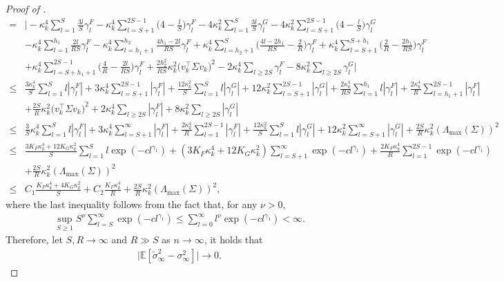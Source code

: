 \documentclass[11pt]{article}
\theoremstyle{plain}
\theoremstyle{definition}
\begin{document}
\begin{proof}[Proof of ]
\begin{align}
    =&\bigg|-\kappa_k^4\sum_{l = 1}^{S}\frac{3l}{S}\gamma_l^F - \kappa_k^4\sum_{l = S+1}^{2S-1}\Big(4-\frac{l}{S}\Big)\gamma_l^F - 4\kappa_k^2\sum_{l = 1}^{S}\frac{3l}{S}\gamma_l^G - 4\kappa_k^2\sum_{l = S+1}^{2S-1}\Big(4-\frac{l}{S}\Big)\gamma_l^G\nonumber \\
    &- \kappa_k^4\sum_{l = 1}^{h_1}\frac{2l}{RS}\gamma_l^F - \kappa_k^4\sum_{l = h_1+1}^{h_2}\frac{4h_1-2l}{RS}\gamma_l^F + \kappa_k^4\sum_{l = h_2+1}^{S}\Big(\frac{4l - 2h_1}{RS} - \frac{2}{R}\Big)\gamma_l^F + \kappa_k^4\sum_{l = S+1}^{S+h_1}\Big(\frac{2}{R}-\frac{2h_1}{RS}\Big)\gamma_l^F \nonumber\\
    &+ \kappa_k^4\sum_{l = S+h_1+1}^{2S-1}\Big(\frac{4}{R}-\frac{2l}{RS}\Big)\gamma_l^F  + \frac{2h_2^2}{RS}\kappa_k^2\big(v_k^{\top}\Sigma v_k\big)^2 - 2\kappa_k^4\sum_{l \geq 2S}\gamma_l^F - 8\kappa_k^2\sum_{l \geq 2S}\gamma_l^G \bigg| \nonumber\\
    \leq& \frac{3\kappa_k^4}{S}\sum_{l = 1}^{S}l|\gamma_l^F| + 3\kappa_k^4\sum_{l = S+1}^{2S-1}|\gamma_l^F| + \frac{12\kappa_k^2}{S}\sum_{l = 1}^{S}l|\gamma_l^G| + 12\kappa_k^2\sum_{l = S+1}^{2S-1}|\gamma_l^G| + \frac{2\kappa_k^4}{RS}\sum_{l = 1}^{h_1}l|\gamma_l^F| + \frac{2\kappa_k^4}{R}\sum_{l = h_1+1}^{2S-1}|\gamma_l^F| \nonumber\\
    &+ \frac{2S}{R}\kappa_k^2\big(v_k^{\top}\Sigma v_k\big)^2 + 2\kappa_k^4\sum_{l \geq 2S}|\gamma_l^F| + 8\kappa_k^2\sum_{l \geq 2S}|\gamma_l^G| \nonumber\\
    \leq& \frac{3}{S}\kappa_k^4\sum_{l = 1}^{S}l|\gamma_l^F| + 3\kappa_k^4\sum_{l = S+1}^{\infty}|\gamma_l^F| + \frac{2\kappa_k^4}{R}\sum_{l = 1}^{2S-1}|\gamma_l^F| + \frac{12\kappa_k^2}{S}\sum_{l = 1}^{S}l|\gamma_l^G| + 12\kappa_k^2\sum_{l = S+1}^{\infty}|\gamma_l^G| + \frac{2S}{R}\kappa_k^2(\Lambda_{\max}(\Sigma))^2 \nonumber\\
    \leq& \frac{3K_F\kappa_k^4 + 12K_G\kappa_k^2}{S}\sum_{l = 1}^{S}l\exp(-cl^{\gamma_1}) + (3K_F\kappa_k^4+12K_G\kappa_k^2)\sum_{l = S+1}^{\infty}\exp(-cl^{\gamma_1}) + \frac{2K_F\kappa_k^4}{R}\sum_{l = 1}^{2S-1}\exp(-cl^{\gamma_1}) \nonumber\\
    &+ \frac{2S}{R}\kappa_k^2(\Lambda_{\max}(\Sigma))^2 \nonumber\\
    \leq& C_1\frac{K_F\kappa_k^4 + 4K_G\kappa_k^2}{S} + C_2\frac{K_F\kappa_k^4}{R} + \frac{2S}{R}\kappa_k^2(\Lambda_{\max}(\Sigma))^2,
 \end{align}
where the last inequality follows from the fact that, for any $\nu > 0$,
\begin{align*}
    \sup_{S \geq 1}S^{\nu}\sum_{l = S}^{\infty}\exp(-cl^{\gamma_1}) \leq \sum_{l = 0}^{\infty}l^{\nu}\exp(-cl^{\gamma_1}) < \infty.
\end{align*}
Therefore, let $S, R \to \infty$ and $R \gg S$ as $n \to \infty$, it holds that
\begin{align}\label{eq:LRV_L1_conv}
    \big|\mathbb{E}[\check{\sigma}_{\infty}^2 - \sigma_{\infty}^2]\big| \to 0.
\end{align}



\end{proof}
\end{document}
